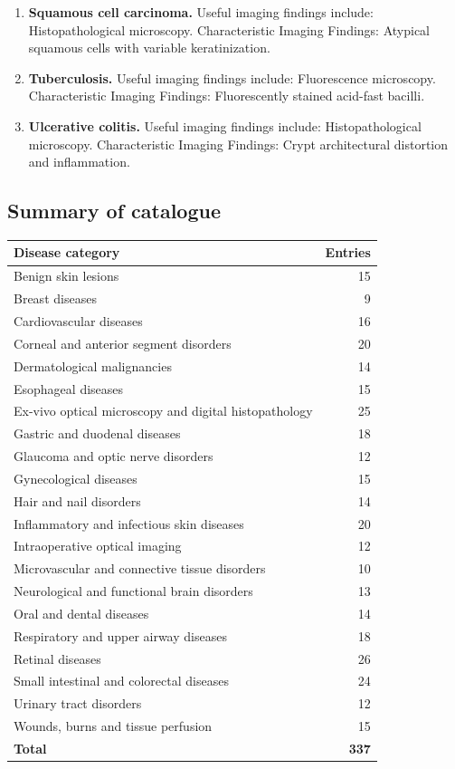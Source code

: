 \begin{enumerate}[leftmargin=*,itemsep=0.45em,topsep=0.4em]
\item \textbf{Squamous cell carcinoma.} Useful imaging findings include: Histopathological microscopy. Characteristic Imaging Findings: Atypical squamous cells with variable keratinization.
\item \textbf{Tuberculosis.} Useful imaging findings include: Fluorescence microscopy. Characteristic Imaging Findings: Fluorescently stained acid-fast bacilli.
\item \textbf{Ulcerative colitis.} Useful imaging findings include: Histopathological microscopy. Characteristic Imaging Findings: Crypt architectural distortion and inflammation.
\end{enumerate}

\subsection{Summary of catalogue}
\begin{center}
\begin{tabular}{@{}p{}r@{}}
\toprule
\textbf{Disease category} & \textbf{Entries} \\
\midrule
Benign skin lesions & 15 \\
Breast diseases & 9 \\
Cardiovascular diseases & 16 \\
Corneal and anterior segment disorders & 20 \\
Dermatological malignancies & 14 \\
Esophageal diseases & 15 \\
Ex-vivo optical microscopy and digital histopathology & 25 \\
Gastric and duodenal diseases & 18 \\
Glaucoma and optic nerve disorders & 12 \\
Gynecological diseases & 15 \\
Hair and nail disorders & 14 \\
Inflammatory and infectious skin diseases & 20 \\
Intraoperative optical imaging & 12 \\
Microvascular and connective tissue disorders & 10 \\
Neurological and functional brain disorders & 13 \\
Oral and dental diseases & 14 \\
Respiratory and upper airway diseases & 18 \\
Retinal diseases & 26 \\
Small intestinal and colorectal diseases & 24 \\
Urinary tract disorders & 12 \\
Wounds, burns and tissue perfusion & 15 \\
\midrule
\textbf{Total} & \textbf{337} \\
\bottomrule
\end{tabular}
\end{center}

